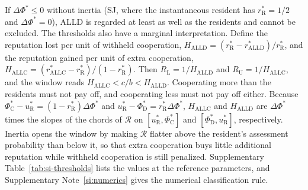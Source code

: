 \documentclass[fleqn,10pt]{wlscirep}
\newcommand{\Rmap}{\mathscr{R}}            %
\newcommand{\rR}{r_{\mathrm{R}}^{*}}
\newcommand{\uR}{u_{\mathrm{R}}^{*}}
\newcommand{\dPhi}{\Delta\Phi^{*}}
\newcommand{\ALLC}{\mathrm{ALLC}}
\newcommand{\ALLD}{\mathrm{ALLD}}
\theoremstyle{plain}
\begin{document}
If $\dPhi\leq0$ without inertia (SJ, where the instantaneous resident has $\rR=1/2$ and $\dPhi=0$), ALLD is regarded at least as well as the residents and cannot be excluded. The thresholds also have a marginal interpretation. Define the reputation lost per unit of withheld cooperation, $H_{\ALLD}=(\rR-r^*_{\ALLD})/\rR$, and the reputation gained per unit of extra cooperation, $H_{\ALLC}=(r^*_{\ALLC}-\rR)/(1-\rR)$. Then $R_{\mathrm L}=1/H_{\ALLD}$ and $R_{\mathrm U}=1/H_{\ALLC}$, and the window reads $H_{\ALLC}<c/b<H_{\ALLD}$. Cooperating more than the residents must not pay off, and cooperating less must not pay off either. Because $\Phi^*_{\mathrm C}-\uR=(1-\rR)\dPhi$ and $\uR-\Phi^*_{\mathrm D}=\rR\dPhi$, $H_{\ALLC}$ and $H_{\ALLD}$ are $\dPhi$ times the slopes of the chords of $\Rmap$ on $[\uR,\Phi^*_{\mathrm C}]$ and $[\Phi^*_{\mathrm D},\uR]$, respectively. Inertia opens the window by making $\Rmap$ flatter above the resident's assessment probability than below it, so that extra cooperation buys little additional reputation while withheld cooperation is still penalized. Supplementary Table~\ref{tab:si-thresholds} lists the values at the reference parameters, and Supplementary Note~\ref{si:numerics} gives the numerical classification rule.
\end{document}
